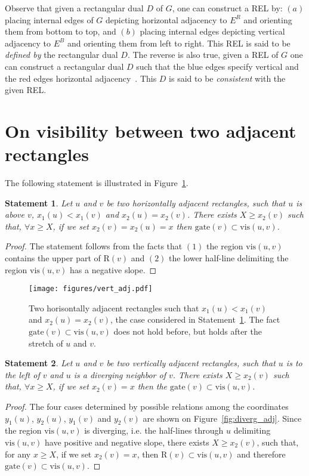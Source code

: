 \documentclass{llncs}
\newtheorem{statement}{Statement}
\newcommand{\gate}{\textrm{gate}}
\newcommand{\vis}{\textrm{vis}}
\newcommand{\R}{\textrm{R}}
\begin{document}
Observe that given a rectangular dual  $D$ of $G$, one can construct a REL by: $(a)$  placing internal edges of $G$ depicting horizontal adjacency to $E^R$  and orienting them from bottom to top, and $(b)$ placing internal edges depicting vertical adjacency to $E^B$ and orienting them from left to right. This REL is said to be \emph{defined by} the rectangular dual $D$. The reverse is also true, given a REL of $G$ one can construct a rectangular dual $D$ such that the blue edges specify vertical and the red edges horizontal adjacency~\cite[Theorem~4.3]{He93}. This $D$ is said to be \emph{consistent} with the given REL.


\section{On visibility between two adjacent rectangles}
\label{sec:visibility}

The following statement  is illustrated in Figure~\ref{fig:hor_adj}.
\begin{statement}
\label{stat:horizontal}
Let $u$ and $v$ be two horizontally adjacent rectangles, such that $u$ is above $v$,  $x_1(u)<x_1(v)$ and $x_2(u)=x_2(v)$.  There exists $X \geq x_2(v)$ such that, $\forall x\geq X$,  if we set $x_2(v) =x_2(u)= x$  then $\gate(v) \subset \vis(u,v)$. 
\end{statement} 
\begin{proof}
The statement follows from the facts that $(1)$ the region  $\vis(u,v)$ contains the upper part of $\R(v)$ and  $(2)$ the lower half-line delimiting the region $\vis(u,v)$ has a negative slope.
\end{proof}

\begin{figure}[htb]
\centering
\texttt{[image: figures/vert\_adj.pdf]}
\caption{Two horisontally adjacent rectangles such that $x_1(u)<x_1(v)$ and $x_2(u)=x_2(v)$, the case considered in Statement~\ref{stat:horizontal}. The fact $\gate(v) \subset \vis(u,v)$ does not hold before, but holds after the stretch of $u$ and $v$.  }
\label{fig:hor_adj}
\end{figure}

\begin{statement}
\label{stat:diverging}
Let $u$ and $v$ be two vertically adjacent rectangles, such that $u$ is to the left of $v$ and $u$ is a diverging neighbor of $v$.  There exists $X \geq x_2(v)$ such that, $\forall x\geq X$,  if we set $x_2(v) = x$  then the $\gate(v) \subset \vis(u,v)$. 
\end{statement}
\begin{proof}
The four cases determined by possible relations among the coordinates $y_1(u)$,  $y_2(u)$,  $y_1(v)$ and  $y_2(v)$ are shown on Figure~\ref{fig:diverg_adj}.
Since the region $\vis(u,v)$ is diverging, i.e. the half-lines through $u$ delimiting $\vis(u,v)$ have positive and negative slope, there exists $X\geq x_2(v)$, such that, for any $x\geq X$, if we set $x_2(v)=x$, then $\R(v) \subset \vis(u,v)$ and therefore $\gate(v) \subset \vis(u,v)$. 
\end{proof}
\end{document}
